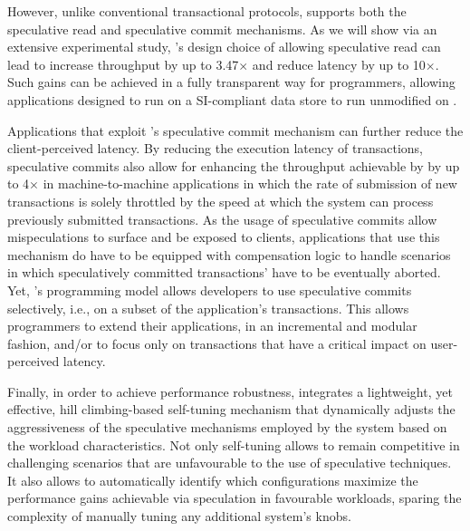 However, unlike conventional transactional protocols, \specula supports both 
the speculative read and speculative commit mechanisms. As we will show via an extensive experimental study, \specula's design choice of allowing speculative read can lead to increase throughput by up to 3.47$\times$ and reduce latency by up to 10$\times$. Such gains can be achieved in a fully transparent way for programmers, allowing applications designed to run on a SI-compliant data store to run unmodified on \specula.

Applications that exploit \specula's speculative commit mechanism can further reduce the client-perceived latency. By reducing the execution latency of transactions,  speculative commits also allow for enhancing the throughput achievable by \specula by up to 4$\times$ in machine-to-machine applications in which the rate of submission of new transactions is solely throttled by the speed at which the system can process previously submitted transactions. As the usage of speculative commits allow mispeculations to surface and be exposed to clients, applications that use this mechanism do have to be equipped with compensation logic to handle scenarios in which speculatively committed transactions' have to be eventually aborted.  Yet, \specula's programming model allows developers to use speculative commits selectively, i.e., on a subset of the application's transactions. This allows programmers to extend their applications, in an incremental and modular fashion, and/or to focus only on  transactions that have a critical impact on user-perceived latency.

Finally, in order to achieve performance robustness, \specula integrates a lightweight, yet effective, hill climbing-based self-tuning  mechanism that dynamically adjusts the aggressiveness of the speculative mechanisms employed by the system based on the workload characteristics. Not only self-tuning allows \specula to remain competitive in challenging scenarios that are unfavourable to the use of speculative techniques. It also allows to automatically identify which configurations maximize the performance gains achievable via speculation in favourable workloads, sparing the complexity of manually tuning any additional system's knobs.




